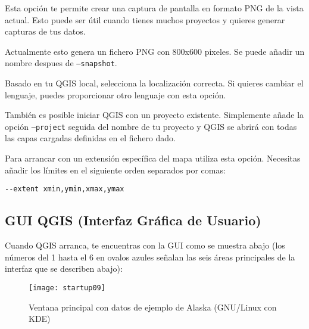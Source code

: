 \begin{Tip} \caption{\textsc{Ejemplo utilizando argumentos en línea de comandos}}
\end{Tip}

Esta opción te permite crear una captura de pantalla en formato PNG de la vista actual.
Esto puede ser útil cuando tienes muchos proyectos y quieres generar capturas de tus datos.

Actualmente esto genera un fichero PNG con 800x600 pixeles. Se puede añadir un nombre despues de
\texttt{---snapshot}.

Basado en tu QGIS local, selecciona la localización correcta. Si quieres cambiar el lenguaje, 
puedes proporcionar otro lenguaje con esta opción.

También es posible iniciar QGIS con un proyecto existente. Simplemente añade 
la opción \texttt{--project} seguida del nombre de tu proyecto y  QGIS se abrirá 
con todas las capas cargadas definidas en el fichero dado.

Para arrancar con un extensión específica del mapa utiliza esta opción. Necesitas
añadir los límites en el siguiente orden separados por comas:
\begin{verbatim}
--extent xmin,ymin,xmax,ymax
\end{verbatim}


\subsection{GUI QGIS (Interfaz Gráfica de Usuario)}
\label{label_qgismainwindow}

Cuando QGIS arranca, te encuentras con la GUI como se muestra abajo
(los números del 1 hasta el 6 en ovalos azules señalan las seis áreas principales 
de la interfaz que se describen abajo):

\begin{figure}[ht]
   \begin{center}
   \caption{Ventana principal con datos de ejemplo de Alaska (GNU/Linux con KDE)}\label{fig:startup}
   \texttt{[image: startup09]}
\end{center} 
\end{figure}

